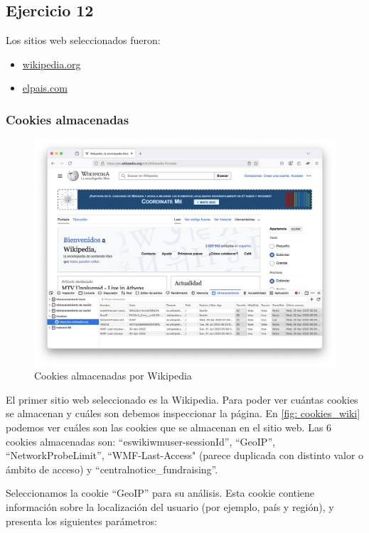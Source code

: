 \subsection{Ejercicio 12}
\graphicspath{ {img/12} }

Los sitios web seleccionados fueron:
\begin{itemize}
    \item \href{www.wikipedia.org}{wikipedia.org}
    \item \href{https://elpais.com/}{elpais.com}
\end{itemize}

\subsubsection{Cookies almacenadas}

\begin{figure}[H]   
    \includegraphics[width=15cm]{cookies_wiki.png}
    \caption{Cookies almacenadas por Wikipedia}
    \label{fig:cookies_wiki}
\end{figure}

El primer sitio web seleccionado es la Wikipedia. Para poder ver cuántas cookies se almacenan y cuáles son debemos inspeccionar la página. En \ref{fig: cookies_wiki} podemos ver cuáles son las cookies que se almacenan en el sitio web. Las 6 cookies almacenadas son: “eswikiwmuser-sessionId”, “GeoIP”, “NetworkProbeLimit”, “WMF-Last-Access" (parece duplicada con distinto valor o ámbito de acceso) y “centralnotice_fundraising”.  

Seleccionamos la cookie “GeoIP” para su análisis. Esta cookie contiene información sobre la localización del usuario (por ejemplo, país y región), y presenta los siguientes parámetros: 

